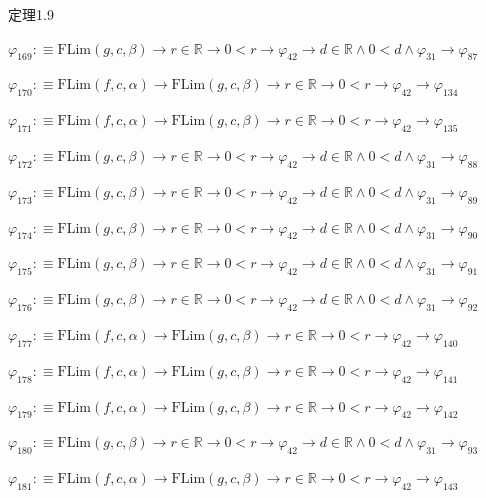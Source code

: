 \begin{fullproof}{定理1.9}
\begin{abbrevlist}
\item $\varphi_{169} :\equiv \mathrm{FLim}(g,c,\beta) \to r \in \mathbb{R} \to 0 < r \to \varphi_{42} \to d \in \mathbb{R} \land 0 < d \land \varphi_{31} \to \varphi_{87}$
\item $\varphi_{170} :\equiv \mathrm{FLim}(f,c,\alpha) \to \mathrm{FLim}(g,c,\beta) \to r \in \mathbb{R} \to 0 < r \to \varphi_{42} \to \varphi_{134}$
\item $\varphi_{171} :\equiv \mathrm{FLim}(f,c,\alpha) \to \mathrm{FLim}(g,c,\beta) \to r \in \mathbb{R} \to 0 < r \to \varphi_{42} \to \varphi_{135}$
\item $\varphi_{172} :\equiv \mathrm{FLim}(g,c,\beta) \to r \in \mathbb{R} \to 0 < r \to \varphi_{42} \to d \in \mathbb{R} \land 0 < d \land \varphi_{31} \to \varphi_{88}$
\item $\varphi_{173} :\equiv \mathrm{FLim}(g,c,\beta) \to r \in \mathbb{R} \to 0 < r \to \varphi_{42} \to d \in \mathbb{R} \land 0 < d \land \varphi_{31} \to \varphi_{89}$
\item $\varphi_{174} :\equiv \mathrm{FLim}(g,c,\beta) \to r \in \mathbb{R} \to 0 < r \to \varphi_{42} \to d \in \mathbb{R} \land 0 < d \land \varphi_{31} \to \varphi_{90}$
\item $\varphi_{175} :\equiv \mathrm{FLim}(g,c,\beta) \to r \in \mathbb{R} \to 0 < r \to \varphi_{42} \to d \in \mathbb{R} \land 0 < d \land \varphi_{31} \to \varphi_{91}$
\item $\varphi_{176} :\equiv \mathrm{FLim}(g,c,\beta) \to r \in \mathbb{R} \to 0 < r \to \varphi_{42} \to d \in \mathbb{R} \land 0 < d \land \varphi_{31} \to \varphi_{92}$
\item $\varphi_{177} :\equiv \mathrm{FLim}(f,c,\alpha) \to \mathrm{FLim}(g,c,\beta) \to r \in \mathbb{R} \to 0 < r \to \varphi_{42} \to \varphi_{140}$
\item $\varphi_{178} :\equiv \mathrm{FLim}(f,c,\alpha) \to \mathrm{FLim}(g,c,\beta) \to r \in \mathbb{R} \to 0 < r \to \varphi_{42} \to \varphi_{141}$
\item $\varphi_{179} :\equiv \mathrm{FLim}(f,c,\alpha) \to \mathrm{FLim}(g,c,\beta) \to r \in \mathbb{R} \to 0 < r \to \varphi_{42} \to \varphi_{142}$
\item $\varphi_{180} :\equiv \mathrm{FLim}(g,c,\beta) \to r \in \mathbb{R} \to 0 < r \to \varphi_{42} \to d \in \mathbb{R} \land 0 < d \land \varphi_{31} \to \varphi_{93}$
\item $\varphi_{181} :\equiv \mathrm{FLim}(f,c,\alpha) \to \mathrm{FLim}(g,c,\beta) \to r \in \mathbb{R} \to 0 < r \to \varphi_{42} \to \varphi_{143}$

\end{abbrevlist}
\end{fullproof}
